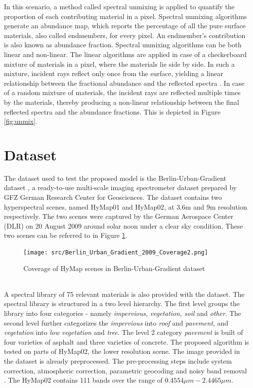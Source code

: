 \documentclass[12pt,twoside]{article}
\theoremstyle{plain}
\theoremstyle{definition}
\theoremstyle{remark}
\newcommand{\forceindent}{\leavevmode{\parindent=2em\indent}}
\begin{document}
In this scenario, a method called spectral unmixing is applied to quantify the proportion of each contributing material in a pixel. Spectral unmixing algorithms generate an abundance map, which reports the percentage of all the pure surface materials, also called endmembers, for every pixel. An endmember's contribution is also known as abundance fraction. Spectral unmixing algorithms can be both linear and non-linear. The linear algorithms are applied in case of  a checkerboard mixture of materials in a pixel, where the materials lie side by side. In such a mixture, incident rays reflect only once from the surface, yielding a linear relationship between the fractional abundance and the reflected spectra \cite{keshava2000algorithm}. In case of a random mixture of materials, the incident rays are reflected multiple times by the materials, thereby producing a non-linear relationship between the final reflected spectra and the abundance fractions. This is depicted in Figure \ref{fig:unmix}.

\section{Dataset}
\label{sec:dataset}
The dataset used to test the proposed model is the Berlin-Urban-Gradient dataset \cite{okujeni2016berlinurbangradient}, a ready-to-use multi-scale imaging spectrometer dataset prepared by GFZ German Research Center for Geosciences. The dataset contains two hyperspectral scenes, named HyMap01 and HyMap02, at 3.6m and 9m resolution respectively. The two scenes were captured by the German Aerospace Center (DLR) on 20 August 2009 around solar noon under a clear sky condition. These two scenes can be referred to in Figure \ref{fig:data}.
\begin{figure}[hbtp]
\centering
\texttt{[image: src/Berlin\_Urban\_Gradient\_2009\_Coverage2.png]}
\caption{Coverage of HyMap scenes in Berlin-Urban-Gradient dataset \cite{okujeni2016berlinurbangradient}}
\label{fig:data}
\end{figure}
\\ \forceindent A spectral library of 75 relevant materials is also provided with the dataset. The spectral library is structured in a two level hierarchy. The first level groups the library into four categories - namely \textit{impervious, vegetation, soil} and \textit{other}. The second level further categorizes the \textit{impervious} into \textit{roof} and \textit{pavement}, and \textit{vegetation} into \textit{low vegetation} and \textit{tree}. The level 2 category \textit{pavement} is built of four varieties of asphalt and three varieties of concrete. The proposed algorithm is tested on parts of HyMap02, the lower resolution scene. The image provided in the dataset is already preprocessed. The pre-processing steps include system correction, atmospheric correction, parametric geocoding and noisy band removal \cite{okujeni2016berlinurbangradient}. The HyMap02 contains 111 bands over the range of $0.4554\mu m - 2.4465\mu m$.
\end{document}
